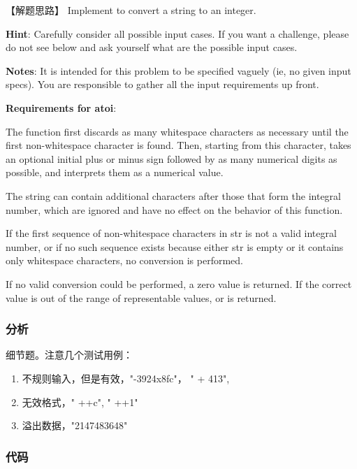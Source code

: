 【解题思路】
Implement  to convert a string to an integer.

\textbf{Hint}: Carefully consider all possible input cases. If you want a challenge, please do not see below and ask yourself what are the possible input cases.

\textbf{Notes}: It is intended for this problem to be specified vaguely (ie, no given input specs). You are responsible to gather all the input requirements up front.

\textbf{Requirements for atoi}:

The function first discards as many whitespace characters as necessary until the first non-whitespace character is found. Then, starting from this character, takes an optional 
initial plus or minus sign followed by as many numerical digits as possible, and interprets them as a numerical value.

The string can contain additional characters after those that form the integral number, which are ignored and have no effect on the behavior of this function.

If the first sequence of non-whitespace characters in str is not a valid integral number, or if no such sequence exists because either str is empty or it contains only whitespace 
characters, no conversion is performed.

If no valid conversion could be performed, a zero value is returned. If the correct value is out of the range of representable values,  or  is returned.

\subsubsection{分析}
细节题。注意几个测试用例：
\begin{enumerate}
	\item 不规则输入，但是有效，"-3924x8fc"， "  +  413",
	\item 无效格式，" ++c", " ++1"
	\item 溢出数据，"2147483648"
\end{enumerate}

\subsubsection{代码}


